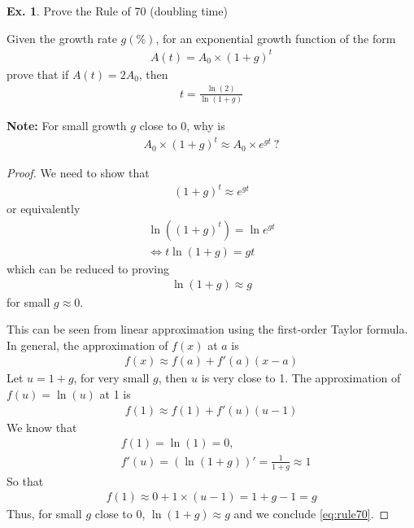 \documentclass[10pt,a4paper]{book}
\theoremstyle{definition}\newtheorem{definition}{Definition}
\theoremstyle{definition}\newtheorem{fact}{Fact}
\theoremstyle{definition}\newtheorem{ex}{Ex.}
\theoremstyle{definition}\newtheorem{project}{Project}
\theoremstyle{definition}\newtheorem{problem}{Problem}
\theoremstyle{definition}\newtheorem{example}{Example}
\numberwithin{theorem}{chapter}
\numberwithin{corollary}{chapter}
\numberwithin{assumption}{chapter}
\numberwithin{definition}{chapter}
\numberwithin{prop}{chapter}
\numberwithin{notation}{chapter}
\numberwithin{problem}{chapter}
\numberwithin{example}{chapter}
\numberwithin{fact}{chapter}
\numberwithin{ex}{chapter}
\begin{document}
	\begin{ex}
		Prove the Rule of 70 (doubling time)
		
		Given the growth rate $g (\%)$, for an exponential growth function of the form
		\begin{align*}
			A(t) = A_0 \times (1+g)^{t} 
		\end{align*}
		prove that if $A(t) = 2 A_0$, then
		\begin{align*}
			t = \frac{\ln(2)}{\ln(1+g)} 
		\end{align*}
	\end{ex}
	
	\textbf{Note:}
	For small growth $g$ close to 0, why is
	\begin{align}
		\label{eq:rule70} A_0 \times (1+g)^t \approx A_0 \times e^{gt} \ ? 
	\end{align} 
	\begin{proof}
		We need to show that
		\begin{align*}
			(1+g)^t \approx e^{gt} 
		\end{align*}
		or equivalently
		\begin{align*}
			\ln ((1+g)^t) = \ln e^{gt}     \\
			\Leftrightarrow t\ln(1+g) = gt 
		\end{align*}
		which can be reduced to proving
		\begin{align*}
			\ln(1+g) \approx g 
		\end{align*}
		for small $g \approx 0$.
		
		This can be seen from linear approximation using the first-order Taylor formula. In general, the approximation of $f(x)$ at $a$ is
		\begin{align*}
			f(x) \approx f(a) + f'(a) (x-a) 
		\end{align*}
		Let $u=1+g$, for very small $g$, then $u$ is very close to 1. The approximation of $f(u) = \ln (u)$ at 1 is
		\begin{align*}
			f(1) \approx f(1) + f'(u) (u-1) 
		\end{align*}
		We know that
		\begin{align*}
			& f(1) = \ln(1) = 0,                            \\
			& f'(u) = (\ln(1+g))' = \frac{1}{1+g} \approx 1 
		\end{align*}
		So that
		\begin{align*}
			f(1) \approx 0 + 1\times(u-1) = 1+g-1 = g 
		\end{align*}
		Thus, for small $g$ close to 0, $\ln(1+g) \approx g$ and we conclude \eqref{eq:rule70}.
	\end{proof}
\end{document}
